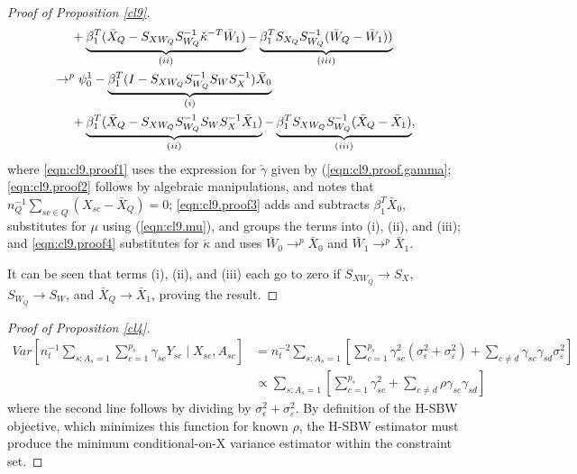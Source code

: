 \begin{proof}[Proof of Proposition \ref{cl9}]
\begin{align}
    \nonumber & \hskip.5cm {} + \underbrace{\beta_1^T (\bar{X}_Q - S_{XW_Q} S_{W_Q}^{-1} \check{\kappa}^{-T}\bar{W}_1)}_{(ii)} - \underbrace{\beta_1^TS_{X_Q}S_{W_Q}^{-1}(\bar{W}_Q - \bar{W}_1))}_{(iii)}\\
\label{eqn:cl9.proof4}    & \to^p \psi_0^1 - \underbrace{\beta_1^T(I - S_{XW_Q}S_{W_Q}^{-1}S_WS_X^{-1})\bar{X}_0}_{(i)} \\
    \nonumber & \hskip.5cm {} + \underbrace{\beta_1^T(\bar{X}_Q - S_{XW_Q}S_{W_Q}^{-1} S_W S_X^{-1} \bar{X}_1)}_{(ii)} - \underbrace{\beta_1^TS_{XW_Q}S_{W_Q}^{-1}(\bar{X}_Q - \bar{X}_1)}_{(iii)}, 
\end{align}
where \eqref{eqn:cl9.proof1} uses the expression for $\check{\gamma}$ given by (\ref{eqn:cl9.proof.gamma}; \eqref{eqn:cl9.proof2} follows by algebraic manipulations, and notes that $n_Q^{-1}\sum_{sc \in Q} (X_{sc} - \bar{X}_Q) = 0$; \eqref{eqn:cl9.proof3} adds and subtracts $\beta_1^T \bar{X}_0$,  substitutes for $\mu$ using (\ref{eqn:cl9.mu}), and groups the terms into (i), (ii), and (iii); and \eqref{eqn:cl9.proof4} substitutes for $\check{\kappa}$ and uses $\bar{W}_0 \to^p \bar{X}_0$ and $\bar{W}_1 \to^p \bar{X}_1$.

It can be seen that terms (i), (ii), and (iii) each go to zero if $S_{XW_Q} \to S_X$, $S_{W_Q} \to S_W$, and $\bar{X}_Q \to \bar{X}_1$, proving the result. 
\end{proof}

\begin{proof}[Proof of Proposition \ref{cl4}]
\begin{align*}
    Var[n_t^{-1}\sum_{s: A_s = 1}\sum_{c = 1}^{p_s}\gamma_{sc}Y_{sc} \mid X_{sc}, A_{sc}] &= n_t^{-2}\sum_{s: A_s = 1}[\sum_{c = 1}^{p_s}\gamma_{sc}^2(\sigma^2_{\epsilon} + \sigma^2_{\varepsilon}) + \sum_{c \ne d}\gamma_{sc}\gamma_{sd}\sigma^2_{\varepsilon}] \\
    &\propto \sum_{s: A_s = 1}[\sum_{c = 1}^{p_s}\gamma_{sc}^2 + \sum_{c \ne d}\rho \gamma_{sc}\gamma_{sd}]
\end{align*}
%
where the second line follows by dividing by $\sigma^2_{\epsilon} + \sigma^2_{\varepsilon}$. By definition of the H-SBW objective, which minimizes this function for known $\rho$, the H-SBW estimator must produce the minimum conditional-on-X variance estimator within the constraint set.
\end{proof}


